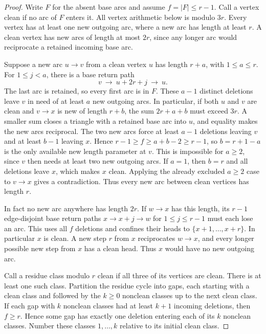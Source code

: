 \documentclass[10pt]{article}
\begin{document}
\begin{proof}
Write \(F\) for the absent base arcs and assume \(f=|F|\le r-1\).
Call a vertex clean if no arc of \(F\) enters it. All vertex arithmetic
below is modulo \(3r\). Every vertex has at least one new outgoing arc,
where a new arc has length at least \(r\). A clean vertex has new arcs
of length at most \(2r\), since any longer arc would reciprocate a
retained incoming base arc.

Suppose a new arc \(u\to v\) from a clean vertex \(u\) has length \(r+a\),
with \(1\le a\le r\). For \(1\le j<a\), there is a base return path
\[
   v\ \longrightarrow\ u+2r+j\ \longrightarrow\ u .
\]
The last arc is retained, so every first arc is in \(F\). These \(a-1\)
distinct deletions leave \(v\) in need of at least \(a\) new outgoing arcs.
In particular, if both \(u\) and \(v\) are clean and \(v\to x\) is new of
length \(r+b\), the sum \(2r+a+b\) must exceed \(3r\). A smaller sum closes
a triangle with a retained base arc into \(u\), and equality makes the
new arcs reciprocal. The two new arcs force at least \(a-1\) deletions
leaving \(v\) and at least \(b-1\) leaving \(x\). Hence
\(r-1\ge f\ge a+b-2\ge r-1\), so \(b=r+1-a\) is the only available new
length parameter at \(v\). This is impossible for \(a\ge2\), since \(v\)
then needs at least two new outgoing arcs. If \(a=1\), then \(b=r\) and
all deletions leave \(x\), which makes \(x\) clean. Applying the already
excluded \(a\ge2\) case to \(v\to x\) gives a contradiction. Thus every
new arc between clean vertices has length \(r\).

In fact no new arc anywhere has length \(2r\). If \(w\to x\) has this
length, its \(r-1\) edge-disjoint base return paths
\(x\to x+j\to w\) for \(1\le j\le r-1\) must each lose an arc. This uses
all \(f\) deletions and confines their heads to
\(\{x+1,\ldots,x+r\}\). In particular \(x\) is clean. A new step \(r\)
from \(x\) reciprocates \(w\to x\), and every longer possible new step
from \(x\) has a clean head. Thus \(x\) would have no new outgoing arc.

Call a residue class modulo \(r\) clean if all three of its vertices
are clean. There is at least one such class. Partition the residue
cycle into gaps, each starting with a clean class and followed by
the \(k\ge0\) nonclean classes up to the next clean class. If each gap
with \(k\) nonclean classes had at least \(k+1\) incoming deletions,
then \(f\ge r\). Hence some gap has exactly one deletion entering
each of its \(k\) nonclean classes. Number these classes
\(1,\ldots,k\) relative to its initial clean class.


\end{proof}
\end{document}
